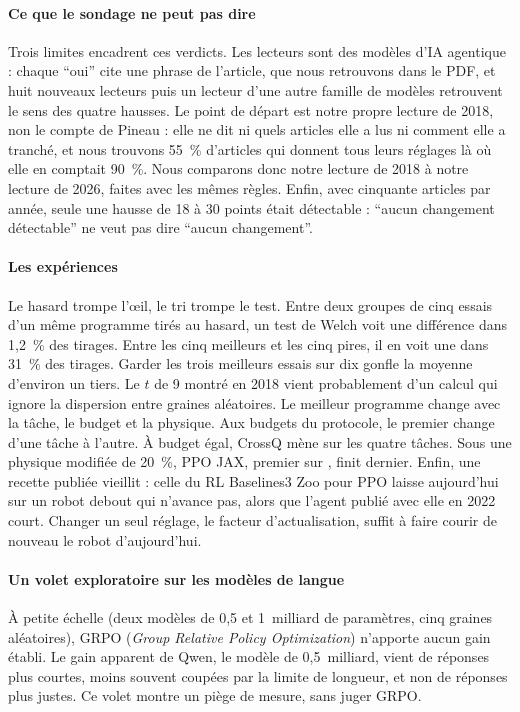 \paragraph{Ce que le sondage ne peut pas dire}
Trois limites encadrent ces verdicts. Les lecteurs sont des modèles d'IA agentique : chaque
\enquote{oui} cite une phrase de l'article, que nous retrouvons dans le PDF, et huit nouveaux lecteurs
puis un lecteur d'une autre famille de modèles retrouvent le sens des quatre hausses. Le point de départ est notre propre lecture de 2018, non le compte de Pineau : elle ne dit ni
quels articles elle a lus ni comment elle a tranché, et nous trouvons 55~\% d'articles qui donnent tous leurs réglages là où elle en comptait
90~\%. Nous comparons donc notre lecture de 2018 à notre lecture de 2026,
faites avec les mêmes règles. Enfin, avec cinquante articles
par année, seule une hausse de 18 à 30 points était détectable : \enquote{aucun changement
détectable} ne veut pas dire \enquote{aucun changement}.

\paragraph{Les expériences}
Le hasard trompe l'œil, le tri trompe le test. Entre deux groupes de cinq essais d'un même programme
tirés au hasard, un test de Welch voit une différence dans 1,2~\% des tirages. Entre les cinq
meilleurs et les cinq pires, il en voit une dans 31~\% des tirages. Garder les trois meilleurs essais
sur dix gonfle la moyenne d'environ un tiers. Le $t$ de 9 montré en 2018 vient probablement d'un
calcul qui ignore la dispersion entre graines aléatoires. Le meilleur programme change avec la tâche, le budget et la physique. Aux budgets du
protocole, le premier change d'une tâche à l'autre. À budget égal, CrossQ mène sur les quatre tâches.
Sous une physique modifiée de 20~\%, PPO JAX, premier sur , finit dernier. Enfin, une recette publiée vieillit :
celle du RL Baselines3 Zoo pour PPO laisse aujourd'hui sur  un robot debout qui n'avance pas,
alors que l'agent publié avec elle en 2022 court. Changer un seul réglage, le facteur
d'actualisation, suffit à faire courir de nouveau le robot d'aujourd'hui.

\paragraph{Un volet exploratoire sur les modèles de langue}
À petite échelle (deux modèles de 0,5 et 1~milliard de paramètres, cinq graines aléatoires), GRPO
(\emph{Group Relative Policy Optimization}) n'apporte aucun gain établi. Le gain apparent de Qwen, le modèle de 0,5~milliard, vient de réponses plus courtes, moins
souvent coupées par la limite de longueur, et non de réponses plus justes. Ce volet montre un piège de mesure, sans juger GRPO.

